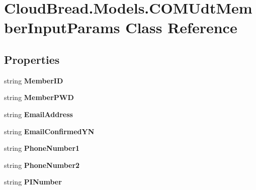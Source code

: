 \hypertarget{a00071}{}\section{Cloud\+Bread.\+Models.\+C\+O\+M\+Udt\+Member\+Input\+Params Class Reference}
\label{a00071}
\subsection*{Properties}
\begin{DoxyCompactItemize}
\item 
string {\bfseries Member\+ID}\hypertarget{a00071_a2686ab7b105ce788721a4c4591847353}{}\label{a00071_a2686ab7b105ce788721a4c4591847353}

\item 
string {\bfseries Member\+P\+WD}\hypertarget{a00071_a1d6d773341b1c44f4a8d8bfb611c51a2}{}\label{a00071_a1d6d773341b1c44f4a8d8bfb611c51a2}

\item 
string {\bfseries Email\+Address}\hypertarget{a00071_a66fd40fe0df558051aecbe3d2586dbec}{}\label{a00071_a66fd40fe0df558051aecbe3d2586dbec}

\item 
string {\bfseries Email\+Confirmed\+YN}\hypertarget{a00071_a0b26b416150698c29ecef3ea9d0306bc}{}\label{a00071_a0b26b416150698c29ecef3ea9d0306bc}

\item 
string {\bfseries Phone\+Number1}\hypertarget{a00071_a4b1b81b8f351205316d54150bd7b0d44}{}\label{a00071_a4b1b81b8f351205316d54150bd7b0d44}

\item 
string {\bfseries Phone\+Number2}\hypertarget{a00071_a3e589f1d9ae574539f7f6c1c773e984e}{}\label{a00071_a3e589f1d9ae574539f7f6c1c773e984e}

\item 
string {\bfseries P\+I\+Number}\hypertarget{a00071_a8493a05ac2e5b8912e3d4f001fba2237}{}\label{a00071_a8493a05ac2e5b8912e3d4f001fba2237}


\end{DoxyCompactItemize}
